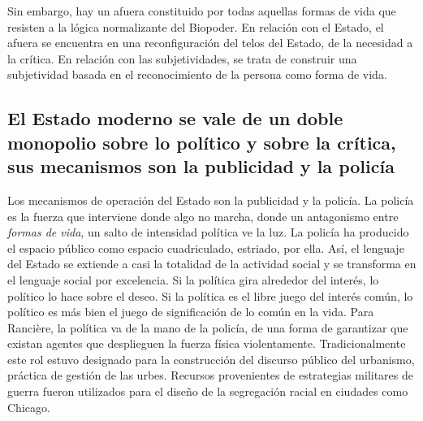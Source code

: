 Sin embargo, hay un afuera constituido por todas aquellas formas de vida que resisten a la lógica normalizante del Biopoder. En relación con el Estado, el afuera se encuentra en una reconfiguración del telos del Estado, de la necesidad a la crítica. En relación con las subjetividades, se trata de construir una subjetividad basada en el reconocimiento de la persona como forma de vida.

\subsection{El Estado moderno se vale de un doble monopolio sobre lo político y sobre la crítica, sus mecanismos son la publicidad y la policía}
\label{sub:el-estado-moderno-se-vale-de}

Los mecanismos de operación del Estado son la publicidad y la policía. La policía es la fuerza que interviene donde algo no marcha, donde un antagonismo entre \emph{formas de vida}, un salto de intensidad política ve la luz. La policía ha producido el espacio público como espacio cuadriculado, estriado, por ella. Así, el lenguaje del Estado se extiende a casi la totalidad de la actividad social y se transforma en el lenguaje social por excelencia. Si la política gira alrededor del interés, lo político lo hace sobre el deseo. Si la política es el libre juego del interés común, lo político es más bien el juego de significación de lo común en la vida. Para Rancière, la política va de la mano de la policía, de una forma de garantizar que existan agentes que desplieguen la fuerza física violentamente. Tradicionalmente este rol estuvo designado para la construcción del discurso público del urbanismo, práctica de gestión de las urbes. Recursos provenientes de estrategias militares de guerra fueron utilizados para el diseño de la segregación racial en ciudades como Chicago.

